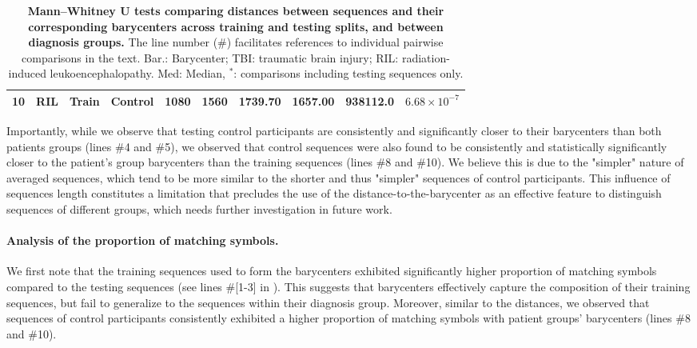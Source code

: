 \begin{chapterabstract}
\begin{table}[htbp]
\begin{tabular}{r l l l r r r r r r}
            10 & RIL & Train  & Control & 1080 & 1560 & 1739.70 & 1657.00 & 938112.0 & $6.68\times10^{-7}$ \\
            \bottomrule
            \end{tabular}
            \caption{\textbf{Mann--Whitney U tests comparing distances between sequences and their corresponding barycenters across training and testing splits, and between diagnosis groups.} The line number ($\#$) facilitates references to individual pairwise comparisons in the text. Bar.: Barycenter; TBI: traumatic brain injury; RIL: radiation-induced leukoencephalopathy. Med: Median, $^*$: comparisons including testing sequences only. }
            \label{tab:mannwhitney_medians_distance}
        \end{table}

        Importantly, while we observe that testing control participants are consistently and significantly closer to their barycenters than both patients groups (lines \#4 and \#5), we observed that control sequences were also found to be consistently and statistically significantly closer to the patient's group barycenters than the training sequences (lines \#8 and \#10). We believe this is due to the "simpler" nature of averaged sequences, which tend to be more similar to the shorter and thus "simpler" sequences of control participants. This influence of sequences length constitutes a limitation that precludes the use of the distance-to-the-barycenter as an effective feature to distinguish sequences of different groups, which needs further investigation in future work.
        
        
        \paragraph{Analysis of the proportion of matching symbols.\\}

        We first note that the training sequences used to form the barycenters exhibited significantly higher proportion of matching symbols compared to the testing sequences (see lines \#[1-3] in ). This suggests that barycenters effectively capture the composition of their training sequences, but fail to generalize to the sequences within their diagnosis group. Moreover, similar to the distances, we observed that sequences of control participants consistently exhibited a higher proportion of matching symbols with patient groups' barycenters (lines \#8 and \#10). 


\end{chapterabstract}
